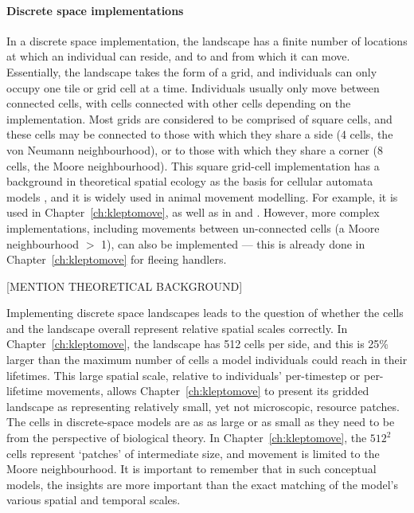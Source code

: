 \paragraph*{Discrete space implementations}

In a discrete space implementation, the landscape has a finite number of locations at which an individual can reside, and to and from which it can move.
Essentially, the landscape takes the form of a grid, and individuals can only occupy one tile or grid cell at a time.
Individuals usually only move between connected cells, with cells connected with other cells depending on the implementation.
Most grids are considered to be comprised of square cells, and these cells may be connected to those with which they share a side (4 cells, the von Neumann neighbourhood), or to those with which they share a corner (8 cells, the Moore neighbourhood).
This square grid-cell implementation has a background in theoretical spatial ecology as the basis for cellular automata models \citep[even those concerned with animals][]{jeltschf.1997}, and it is widely used in animal movement modelling.
For example, it is used in Chapter~\ref{ch:kleptomove}, as well as in \citet{white2018,dinuzzo2020,scherer2020} and \citet{netz2021a}.
However, more complex implementations, including movements between un-connected cells (a Moore neighbourhood $>$ 1), can also be implemented --- this is already done in Chapter~\ref{ch:kleptomove} for fleeing handlers.

[MENTION THEORETICAL BACKGROUND]

Implementing discrete space landscapes leads to the question of whether the cells and the landscape overall represent relative spatial scales correctly.
In Chapter~\ref{ch:kleptomove}, the landscape has 512 cells per side, and this is 25\% larger than the maximum number of cells a model individuals could reach in their lifetimes.
This large spatial scale, relative to individuals' per-timestep or per-lifetime movements, allows Chapter~\ref{ch:kleptomove} to present its gridded landscape as representing relatively small, yet not microscopic, resource patches.
The cells in discrete-space models are as as large or as small as they need to be from the perspective of biological theory.
In Chapter~\ref{ch:kleptomove}, the $512^2$ cells represent `patches' of intermediate size, and movement is limited to the Moore neighbourhood.
It is important to remember that in such conceptual models, the insights are more important than the exact matching of the model's various spatial and temporal scales.

